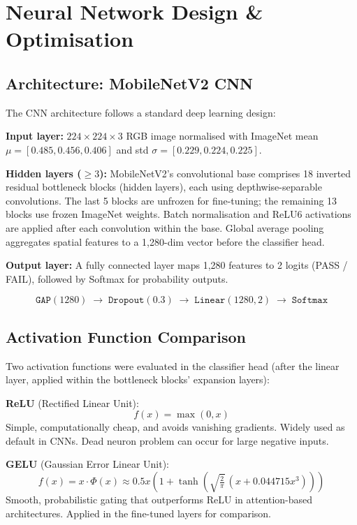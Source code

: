 \documentclass[10pt,twocolumn]{article}
\begin{document}
\section{Neural Network Design \& Optimisation}

\subsection*{Architecture: MobileNetV2 CNN}

The CNN architecture follows a standard deep learning design:

\textbf{Input layer:} $224 \times 224 \times 3$ RGB image normalised with ImageNet mean $\mu = [0.485, 0.456, 0.406]$ and std $\sigma = [0.229, 0.224, 0.225]$.

\textbf{Hidden layers ($\geq 3$):} MobileNetV2's convolutional base comprises 18 inverted residual bottleneck blocks (hidden layers), each using depthwise-separable convolutions. The last 5 blocks are unfrozen for fine-tuning; the remaining 13 blocks use frozen ImageNet weights. Batch normalisation and ReLU6 activations are applied after each convolution within the base. Global average pooling aggregates spatial features to a 1,280-dim vector before the classifier head.

\textbf{Output layer:} A fully connected layer maps 1,280 features to 2 logits (PASS / FAIL), followed by Softmax for probability outputs.

\[
\texttt{GAP}(1280) \;\to\; \texttt{Dropout}(0.3) \;\to\; \texttt{Linear}(1280,2) \;\to\; \texttt{Softmax}
\]

\subsection*{Activation Function Comparison}

Two activation functions were evaluated in the classifier head (after the linear layer, applied within the bottleneck blocks' expansion layers):

\textbf{ReLU} (Rectified Linear Unit):
\[
f(x) = \max(0, x)
\]
Simple, computationally cheap, and avoids vanishing gradients. Widely used as default in CNNs. Dead neuron problem can occur for large negative inputs.

\textbf{GELU} (Gaussian Error Linear Unit):
\[
f(x) = x \cdot \Phi(x) \approx 0.5x\!\left(1 + \tanh\!\left(\sqrt{\tfrac{2}{\pi}}\,(x + 0.044715x^3)\right)\right)
\]
Smooth, probabilistic gating that outperforms ReLU in attention-based architectures. Applied in the fine-tuned layers for comparison.
\end{document}
